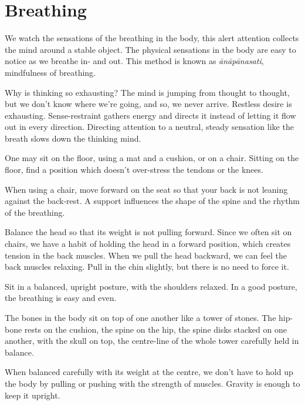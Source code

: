 \chapter{Breathing}


\noindent We watch the sensations of the breathing in the body, this
alert attention collects the mind around a stable object. The physical
sensations in the body are easy to notice as we breathe in- and out.
This method is known as \emph{ānāpānasati}, mindfulness of breathing.

Why is thinking so exhausting? The mind is jumping from thought to
thought, but we don't know where we're going, and so, we never arrive.
Restless desire is exhausting. Sense-restraint gathers energy and
directs it instead of letting it flow out in every direction. Directing
attention to a neutral, steady sensation like the breath slows down the
thinking mind.

One may sit on the floor, using a mat and a cushion, or on a chair.
Sitting on the floor, find a position which doesn't over-stress the
tendons or the knees.

When using a chair, move forward on the seat so that your back is not
leaning against the back-rest. A support influences the shape of the
spine and the rhythm of the breathing.

Balance the head so that its weight is not pulling forward. Since we
often sit on chairs, we have a habit of holding the head in a forward
position, which creates tension in the back muscles. When we pull the
head backward, we can feel the back muscles relaxing. Pull in the chin
slightly, but there is no need to force it.

\clearpage
\null\thispagestyle{empty}%
%
%
\label{illus-sitting-meditation}%
\clearpage

Sit in a balanced, upright posture, with the shoulders relaxed. In a
good posture, the breathing is easy and even.

The bones in the body sit on top of one another like a tower of stones.
The hip-bone rests on the cushion, the spine on the hip, the spine disks
stacked on one another, with the skull on top, the centre-line of the
whole tower carefully held in balance.

When balanced carefully with its weight at the centre, we don't have to
hold up the body by pulling or pushing with the strength of muscles.
Gravity is enough to keep it upright.

